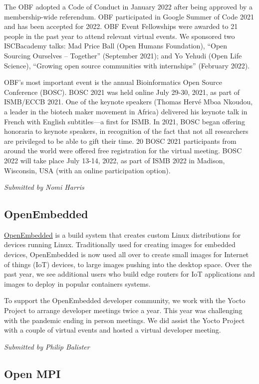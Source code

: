 \documentclass[a4paper]{report}
\begin{document}
The OBF adopted a Code of Conduct in January 2022 after being approved by a membership-wide referendum. OBF participated in Google Summer of Code 2021 and has been accepted for 2022.  OBF Event Fellowships were awarded to 21 people in the past year to attend relevant virtual events. We sponsored two ISCBacademy talks: Mad Price Ball (Open Humans Foundation), ``Open Sourcing Ourselves -- Together'' (September 2021); and Yo Yehudi (Open Life Science), ``Growing open source communities with internships'' (February 2022).

OBF's most important event is the annual Bioinformatics Open Source Conference (BOSC). BOSC 2021 was held online July 29-30, 2021, as part of ISMB/ECCB 2021. One of the keynote speakers (Thomas Hervé Mboa Nkoudou, a leader in the biotech maker movement in Africa) delivered his keynote talk in French with English subtitles---a first for ISMB. In 2021, BOSC began offering honoraria to keynote speakers, in recognition of the fact that not all researchers are privileged to be able to gift their time. 20 BOSC 2021 participants from around the world were offered free registration for the virtual meeting. BOSC 2022 will take place July 13-14, 2022, as part of ISMB 2022 in Madison, Wisconsin, USA (with an online participation option).

{\em Submitted by Nomi Harris}

\subsection{OpenEmbedded}

\href{https://www.openembedded.org/}{OpenEmbedded} is a build system that creates custom Linux distributions for devices running Linux. Traditionally used for creating images for embedded devices, OpenEmbedded is now used all over to create small images for Internet of things (IoT) devices, to large images pushing into the desktop space.  Over the past year, we see additional users who build edge routers for IoT applications and images to deploy in popular containers systems.

To support the OpenEmbedded developer community, we work with the Yocto Project to arrange developer meetings twice a year. This year was challenging with the pandemic ending in person meetings. We did assist the Yocto Project with a couple of virtual events and hosted a virtual developer meeting.

{\em Submitted by Philip Balister}

\subsection{Open MPI}
\end{document}
